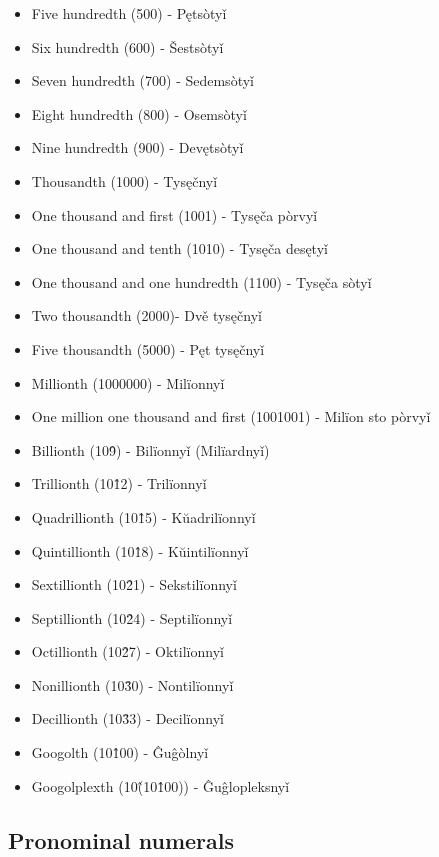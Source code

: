 \begin{itemize}
	\item Five hundredth (500) - Pętsòtyǐ
	\item Six hundredth (600) - Šestsòtyǐ
	\item Seven hundredth (700) - Sedemsòtyǐ
	\item Eight hundredth (800) - Osemsòtyǐ
	\item Nine hundredth (900) - Devętsòtyǐ
	\item Thousandth (1000) - Tysęčnyǐ
	\item One thousand and first (1001) - Tysęča pòrvyǐ
	\item One thousand and tenth (1010) - Tysęča desętyǐ
	\item One thousand and one hundredth (1100) - Tysęča sòtyǐ
	\item Two thousandth (2000)- Dvě tysęčnyǐ
	\item Five thousandth (5000) - Pęt tysęčnyǐ
	\item Millionth (1000000) - Milïonnyǐ
	\item One million one thousand and first (1001001) - Milïon sto pòrvyǐ
	\item Billionth (10\^9) - Bilïonnyǐ (Milïardnyǐ)
	\item Trillionth (10\^12) - Trilïonnyǐ
	\item Quadrillionth (10\^15) - Kŭadrilïonnyǐ
	\item Quintillionth (10\^18) - Kŭintilïonnyǐ
	\item Sextillionth (10\^21) - Sekstilïonnyǐ
	\item Septillionth (10\^24) - Septilïonnyǐ
	\item Octillionth (10\^27) - Oktilïonnyǐ
	\item Nonillionth (10\^30) - Nontilïonnyǐ
	\item Decillionth (10\^33) - Decilïonnyǐ
	\item Googolth (10\^100) - Ĝuĝòlnyǐ
	\item Googolplexth (10\^(10\^100)) - Ĝuĝlopleksnyǐ
\end{itemize}

\subsection{Pronominal numerals}



